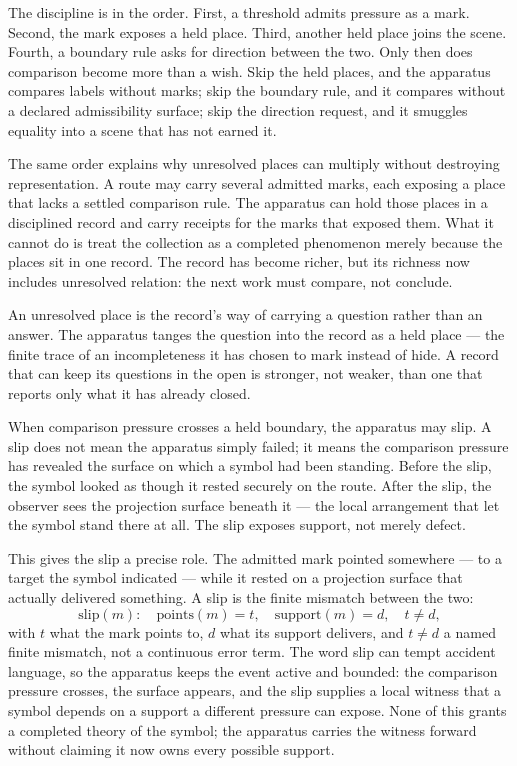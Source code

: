 The discipline is in the order. First, a threshold admits pressure as a mark. Second, the mark exposes a held place. Third, another held place joins the scene. Fourth, a boundary rule asks for direction between the two. Only then does comparison become more than a wish. Skip the held places, and the apparatus compares labels without marks; skip the boundary rule, and it compares without a declared admissibility surface; skip the direction request, and it smuggles equality into a scene that has not earned it.

The same order explains why unresolved places can multiply without destroying representation. A route may carry several admitted marks, each exposing a place that lacks a settled comparison rule. The apparatus can hold those places in a disciplined record and carry receipts for the marks that exposed them. What it cannot do is treat the collection as a completed phenomenon merely because the places sit in one record. The record has become richer, but its richness now includes unresolved relation: the next work must compare, not conclude.

An unresolved place is the record's way of carrying a question rather than an answer. The apparatus tanges the question into the record as a held place --- the finite trace of an incompleteness it has chosen to mark instead of hide. A record that can keep its questions in the open is stronger, not weaker, than one that reports only what it has already closed.

When comparison pressure crosses a held boundary, the apparatus may slip. A slip does not mean the apparatus simply failed; it means the comparison pressure has revealed the surface on which a symbol had been standing. Before the slip, the symbol looked as though it rested securely on the route. After the slip, the observer sees the projection surface beneath it --- the local arrangement that let the symbol stand there at all. The slip exposes support, not merely defect.

This gives the slip a precise role. The admitted mark pointed somewhere --- to a target the symbol indicated --- while it rested on a projection surface that actually delivered something. A slip is the finite mismatch between the two:
\[ \mathrm{slip}(m): \quad \mathrm{points}(m) = t, \quad \mathrm{support}(m) = d, \quad t \neq d, \]
with $t$ what the mark points to, $d$ what its support delivers, and $t \neq d$ a named finite mismatch, not a continuous error term. The word slip can tempt accident language, so the apparatus keeps the event active and bounded: the comparison pressure crosses, the surface appears, and the slip supplies a local witness that a symbol depends on a support a different pressure can expose. None of this grants a completed theory of the symbol; the apparatus carries the witness forward without claiming it now owns every possible support.

